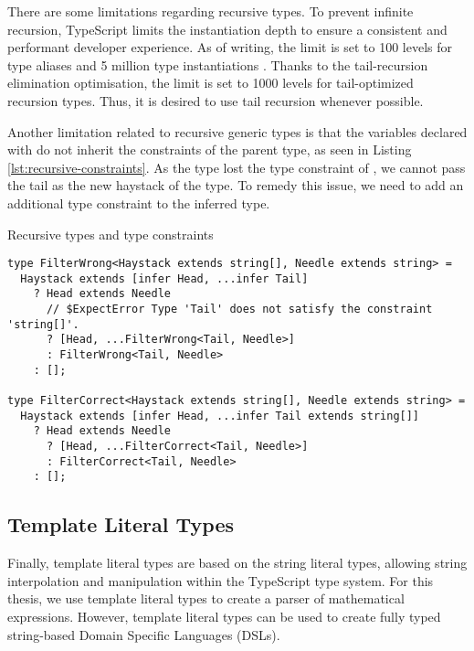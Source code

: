 There are some limitations regarding recursive types. To prevent infinite recursion, TypeScript limits the instantiation depth to ensure a consistent and performant developer experience. As of writing, the limit is set to 100 levels for type aliases and 5 million type instantiations \cite{ImplementationCheckerTs2023}. Thanks to the tail-recursion elimination optimisation, the limit is set to 1000 levels for tail-optimized recursion types. Thus, it is desired to use tail recursion whenever possible.

Another limitation related to recursive generic types is that the variables declared with  do not inherit the constraints of the parent type, as seen in Listing \ref{lst:recursive-constraints}. As the  type lost the type constraint of , we cannot pass the tail as the new haystack of the  type. To remedy this issue, we need to add an additional type constraint to the inferred type.

\begin{listing}[ht]
  \caption{Recursive types and type constraints}\label{lst:recursive-constraints}
  \begin{verbatim}
type FilterWrong<Haystack extends string[], Needle extends string> =
  Haystack extends [infer Head, ...infer Tail]
    ? Head extends Needle
      // $ExpectError Type 'Tail' does not satisfy the constraint 'string[]'.
      ? [Head, ...FilterWrong<Tail, Needle>]
      : FilterWrong<Tail, Needle>
    : [];

type FilterCorrect<Haystack extends string[], Needle extends string> =
  Haystack extends [infer Head, ...infer Tail extends string[]]
    ? Head extends Needle
      ? [Head, ...FilterCorrect<Tail, Needle>]
      : FilterCorrect<Tail, Needle>
    : [];
\end{verbatim}
\end{listing}

\subsection{Template Literal Types}

Finally, template literal types are based on the string literal types, allowing string interpolation and manipulation within the TypeScript type system. For this thesis, we use template literal types to create a parser of mathematical expressions. However, template literal types can be used to create fully typed string-based Domain Specific Languages (DSLs).


